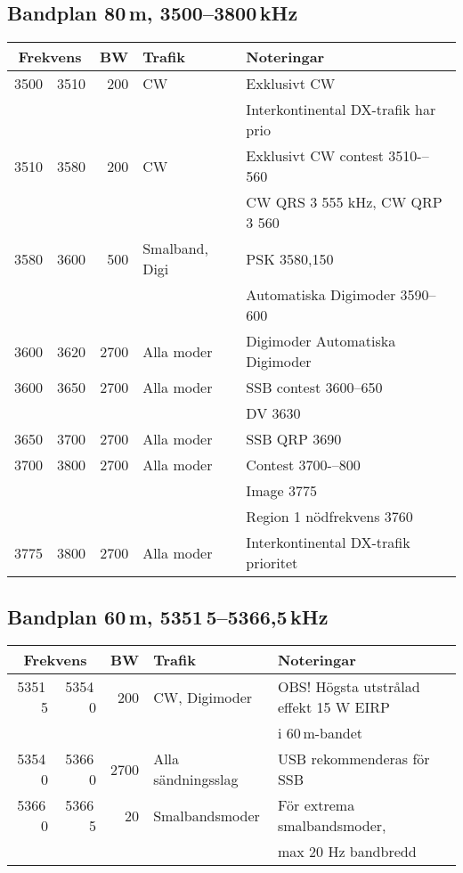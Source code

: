 \subsection{Bandplan 80\,m, 3500--3800\,kHz}
\begin{tabular}{rrrll}
\multicolumn{2}{c}{\textbf{Frekvens}} & \textbf{BW} & \textbf{Trafik} & \textbf{Noteringar} \\ \hline
3500 & 3510 & 200  & CW             & Exklusivt CW                         \\
      &       &      &                & Interkontinental DX-trafik har prio  \\ \hline
3510 & 3580 & 200  & CW             & Exklusivt CW contest 3510-–560       \\
      &       &      &                & CW QRS 3 555 kHz, CW QRP 3 560       \\ \hline
3580 & 3600 & 500  & Smalband, Digi & PSK 3580,150                        \\
      &       &      &                & Automatiska Digimoder 3590--600     \\ \hline
3600 & 3620 & 2700 & Alla moder     & Digimoder Automatiska Digimoder      \\ \hline
3600 & 3650 & 2700 & Alla moder     & SSB contest 3600--650               \\
      &       &      &                & DV 3630                             \\ \hline
3650 & 3700 & 2700 & Alla moder     & SSB QRP 3690                        \\ \hline
3700 & 3800 & 2700 & Alla moder     & Contest 3700-–800                   \\
      &       &      &                & Image 3775                          \\
      &       &      &                & Region 1 nödfrekvens 3760           \\ \hline
3775 & 3800 & 2700 & Alla moder     & Interkontinental DX-trafik prioritet \\ \hline
\end{tabular}


\subsection{Bandplan 60\,m, 5351\,5--5366,5\,kHz}
\begin{tabular}{rrrll}
\multicolumn{2}{c}{\textbf{Frekvens}} & \textbf{BW} & \textbf{Trafik} & \textbf{Noteringar} \\ \hline
5351\,5 & 5354\,0 &  200 & CW, Digimoder      & OBS! Högsta utstrålad effekt 15 W EIRP\\
        &         &      &                    & i 60\,m-bandet\\ \hline
5354\,0 & 5366\,0 & 2700 & Alla sändningsslag & USB rekommenderas för SSB\\ \hline
5366\,0 & 5366\,5 &   20 & Smalbandsmoder     & För extrema smalbandsmoder,\\
        &         &      &                    & max 20 Hz bandbredd\\ \hline
\end{tabular}

